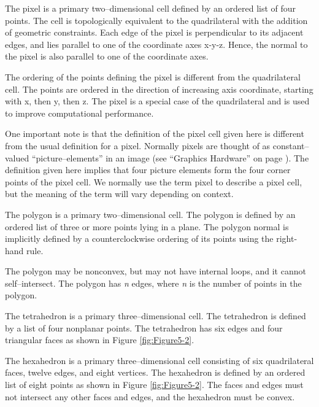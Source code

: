 \begin{description}[leftmargin=0cm,labelindent=0cm]
\item[Pixel.\index{cell!pixel}\index{pixel}] The pixel is a primary two--dimensional cell defined by an ordered list of four points. The cell is topologically equivalent to the quadrilateral with the addition of geometric constraints. Each edge of the pixel is perpendicular to its adjacent edges, and lies parallel to one of the coordinate axes x-y-z. Hence, the normal to the pixel is also parallel to one of the coordinate axes.

The ordering of the points defining the pixel is different from the quadrilateral cell. The points are ordered in the direction of increasing axis coordinate, starting with x, then y, then z. The pixel is a special case of the quadrilateral and is used to improve computational performance.

One important note is that the definition of the pixel cell given here is different from the usual definition for a pixel. Normally pixels are thought of as constant--valued ``picture--elements'' in an image (see ``Graphics Hardware'' on page \pageref{sec:graphics_hardware}). The definition given here implies that four picture elements form the four corner points of the pixel cell. We normally use the term pixel to describe a pixel cell, but the meaning of the term will vary depending on context.

\item[Polygon.\index{cell!polygon}\index{polygon}] The polygon is a primary two--dimensional cell. The polygon is defined by an ordered list of three or more points lying in a plane. The polygon normal is implicitly defined by a counterclockwise ordering of its points using the right-hand rule.

The polygon may be nonconvex, but may not have internal loops, and it cannot self--intersect. The polygon has \emph{n} edges, where \emph{n} is the number of points in the polygon.

\item[Tetrahedron.\index{cell!tetrahedron}\index{tetrahedron}] The tetrahedron is a primary three--dimensional cell. The tetrahedron is defined by a list of four nonplanar points. The tetrahedron has six edges and four triangular faces as shown in Figure \ref{fig:Figure5-2}.

\item[Hexahedron.\index{cell!hexahedron}\index{hexahedron!interpolation function}\index{hexahedron!parametric coordinates}] The hexahedron is a primary three--dimensional cell consisting of six quadrilateral faces, twelve edges, and eight vertices. The hexahedron is defined by an ordered list of eight points as shown in Figure \ref{fig:Figure5-2}. The faces and edges must not intersect any other faces and edges, and the hexahedron must be convex.


\end{description}
